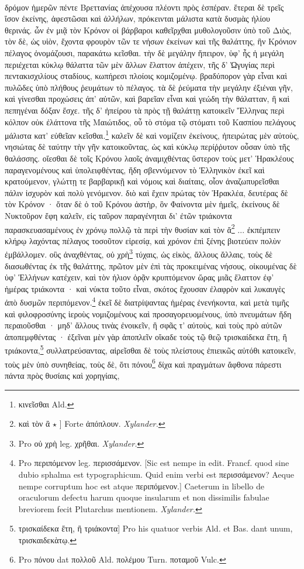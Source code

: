 \documentclass[a4paper, 11pt, oneside, polutonikogreek, german]{article}
\begin{document}
\paragraph{}
δρόμον ἡμερῶν πέντε Βρεττανίας ἀπέχουσα πλέοντι πρὸς ἑσπέραν. ἕτεραι δὲ τρεῖς ἴσον ἐκείνης, ἀφεστῶσαι καὶ ἀλλήλων, πρόκεινται μάλιστα κατὰ δυσμὰς ἡλίου θερινάς. ὧν ἐν μιᾷ τὸν Κρόνον οἱ βάρβαροι καθεῖρχθαι μυθολογοῦσιν ὑπὸ τοῦ Διὸς, τὸν δὲ, ὡς υἱὸν, ἔχοντα φρουρὸν τῶν τε νήσων ἐκείνων καὶ τῆς θαλάττης, ἣν Κρόνιον πέλαγος ὀνομάζουσι, παρακάτω κεῖσθαι. τὴν δὲ μεγάλην ἤπειρον, ὑφ' ἧς ἡ μεγάλη περιέχεται κύκλῳ θάλαττα τῶν μὲν ἄλλων ἔλαττον ἀπέχειν, τῆς δ' Ὠγυγίας περὶ πεντακισχιλίους σταδίους, κωπήρεσι πλοίοις κομιζομένῳ. βραδύπορον γὰρ εἶναι καὶ πυλῶδες ὑπὸ πλήθους ῥευμάτων τὸ πέλαγος. τὰ δὲ ῥεύματα τὴν μεγάλην ἐξιέναι γῆν, καὶ γίνεσθαι προχώσεις ἀπ' αὐτῶν, καὶ βαρεῖαν εἶναι καὶ γεώδη τὴν θάλατταν, ἢ καὶ πεπηγέναι δόξαν ἔσχε. τῆς δ' ἠπείρου τὰ πρὸς τῇ θαλάττῃ κατοικεῖν Ἕλληνας περὶ κόλπον οὐκ ἐλάττονα τῆς Μαιώτιδος, οὗ τὸ στόμα τῷ στόματι τοῦ Κασπίου πελάγους μάλιστα κατ' εὐθεῖαν κεῖσθαι.\footnote{κινεῖσθαι Ald.} καλεῖν δὲ καὶ νομίζειν ἐκείνους, ἠπειρώτας μὲν αὐτοὺς, νησιώτας δὲ ταύτην τὴν γῆν κατοικοῦντας, ὡς καὶ κύκλῳ περίῤῥυτον οὖσαν ὑπὸ τῆς θαλάσσης. οἴεσθαι δὲ τοῖς Κρόνου λαοῖς ἀναμιχθέντας ὕστερον τοὺς μετ' Ἡρακλέους παραγενομένους καὶ ὑπολειφθέντας, ἤδη σβεννύμενον τὸ Ἑλληνικὸν ἐκεῖ καὶ κρατούμενον, γλώττῃ τε βαρβαρικῇ καὶ νόμοις καὶ διαίταις, οἷον ἀναζωπυρεῖσθαι πάλιν ἰσχυρὸν καὶ πολὺ γενόμενον. διὸ καὶ ἔχειν πρώτας τὸν Ἡρακλέα, δευτέρας δὲ τὸν Κρόνον · ὅταν δὲ ὁ τοῦ Κρόνου ἀστὴρ, ὃν Φαίνοντα μὲν ἡμεῖς, ἐκείνους δὲ Νυκτοῦρον ἔφη καλεῖν, εἰς ταῦρον παραγένηται δι' ἐτῶν τριάκοντα παρασκευασαμένους ἐν χρόνῳ πολλῷ τὰ περὶ τὴν θυσίαν καὶ τὸν ἄ\footnote{καὶ τὸν ἂ $\star$ ] Forte ἀπόπλουν. \emph{Xylander.}} ... ἐκπέμπειν κλήρῳ λαχόντας πέλαγος τοσοῦτον εἰρεσίᾳ, καὶ χρόνον ἐπὶ ξένης βιοτεύειν πολὺν ἐμβάλλομεν. οὓς ἀναχθέντας, οὐ χρὴ\footnote{Pro οὐ χρὴ leg. χρῆθαι. \emph{Xylander.}} τύχαις, ὡς εἰκὸς, ἄλλους ἄλλαις, τοὺς δὲ διασωθέντας ἐκ τῆς θαλάττης, πρῶτον μὲν ἐπὶ τὰς προκειμένας νήσους, οἰκουμένας δὲ ὑφ' Ἑλλήνων κατέχειν, καὶ τὸν ἡλιον ὁρᾷν κρυπτόμενον ὥρας μιᾶς ἔλαττον ἐφ' ἡμέρας τριάκοντα · καὶ νύκτα τοῦτο εἶναι, σκότος ἔχουσαν ἐλαφρὸν καὶ λυκαυγὲς ἀπὸ δυσμῶν περιπόμενον.\footnote{Pro περιπόμενον leg. περισσάμενον. [Sic est nempe in edit. Francf. quod sine dubio sphalma est typographicum. Quid enim verbi est περισσάμενον? Aeque nempe corruptum hoc est atque περιπόμενον.] Caeterum in libello de oraculorum defectu harum quoque insularum et non dissimilis fabulae breviorem fecit Plutarchus mentionem. \emph{Xylander.}} ἐκεῖ δὲ διατρίψαντας ἡμέρας ἐνενήκοντα, καὶ μετὰ τιμῆς καὶ φιλοφροσύνης ἱεροὺς νομιζομένους καὶ προσαγορευομένους, ὑπὸ πνευμάτων ἤδη περαιοῦσθαι · μηδ' ἄλλους τινὰς ἐνοικεῖν, ἢ σφᾶς τ' αὐτοὺς, καὶ τοὺς πρὸ αὐτῶν ἀποπεμφθέντας · ἐξεῖναι μὲν γὰρ ἀποπλεῖν οἴκαδε τοὺς τῷ θεῷ τρισκαίδεκα ἔτη, ἢ τριάκοντα,\footnote{τρισκαίδεκα ἔτη, ἢ τριάκοντα] Pro his quatuor verbis Ald. et Bas. dant unum, τρισκαιδεκὰτῳ.} συλλατρεύσαντας, αἱρεῖσθαι δὲ τοὺς πλείστους ἐπιεικῶς αὐτόθι κατοικεῖν, τοὺς μὲν ὑπὸ συνηθείας, τοὺς δὲ, ὅτι πόνου\footnote{Pro πόνου dat πολλοῦ Ald. πολέμου Turn. ποταμοῦ Vulc.} δίχα καὶ πραγμάτων ἄφθονα πάρεστι πάντα πρὸς θυσίαις καὶ χορηγίαις, 
\end{document}
